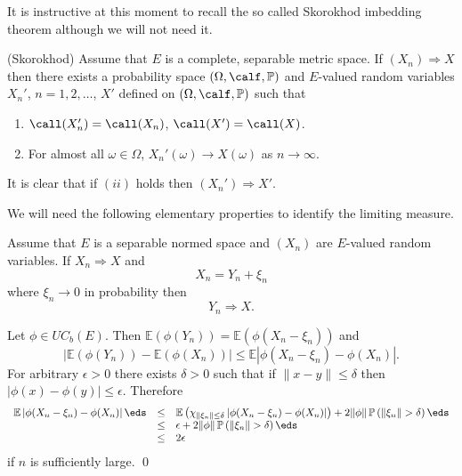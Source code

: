 \documentclass[preprint]{imsart}
\def\P{\mathbb P}
\def\E{\mathbb E}
\def\ds{\displaystyle}
\begin{document}
{It is instructive at this moment to recall the so
called Skorokhod imbedding theorem although we will not
need it.

\begin{Theorem} (Skorokhod)
Assume that $E$ is a complete,
separable  metric space. If
$(X_n)\Rightarrow X$ then there exists a probability
space $(\Omega ,\calf,\P)$ and $E$-valued random
variables $X_n'$, $n=1,2,\ldots$, $X'$ defined on
$(\Omega ,\calf,\P)$ such that
\begin{enumerate}
  \item[(i)] $\call(X_n')=\call(X_n)$,
  $\call(X')=\call(X)$.

  \item[(ii)] For almost all $\omega\in \Omega$,
   $X_n'(\omega) \to X(\omega)$ as $n\to\infty$.

\end{enumerate}

\end{Theorem}

\begin{Remark}\begin{em}
It is clear that if $(ii)$ holds then
$(X_n')\Rightarrow X'$.
\end{em}
\end{Remark}

We will need the following elementary properties to
identify the limiting measure.

\begin{Proposition}\label{sommaprob}
Assume that $E$ is a separable normed space and $(X_n)$
are $E$-valued random variables. If $X_n\Rightarrow X$
and
$$
X_n=Y_n+\xi_n
$$
where $\xi_n\to 0$ in probability then
$$
Y_n\Rightarrow X.
$$
\end{Proposition}


Let $\phi\in UC_b(E)$. Then
$\E(\phi(Y_n))=\E(\phi(X_n-\xi_n))$ and
$$
\left| \E(\phi(Y_n)) -\E(\phi(X_n))\right| \leq
\E \left| \phi(X_n-\xi_n) -\phi(X_n)\right| .
$$
For arbitrary $\epsilon >0$ there exists $\delta >0$
such that if $\|x-y\|\leq\delta$ then
$|\phi(x)-\phi(y)|\leq \epsilon$. Therefore
$$
  \begin{array}{lll}
    \ds \E \left| \phi(X_n-\xi_n) -\phi(X_n)\right|\eds
    &\leq & \ds
\E \left( \chi_{\|\xi_n\|\leq \delta}
\left| \phi(X_n-\xi_n) -\phi(X_n)\right|\right)
+ 2 \|\phi\|\, \P\left( \|\xi_n\|>\delta\right)
    \eds \\
     &\leq & \ds
     \epsilon +
      2 \|\phi\|\, \P\left( \|\xi_n\|>\delta\right)
      \eds
      \\
      & \leq & 2\epsilon
  \end{array}
$$
if $n$ is sufficiently large. \qed


}
\end{document}
